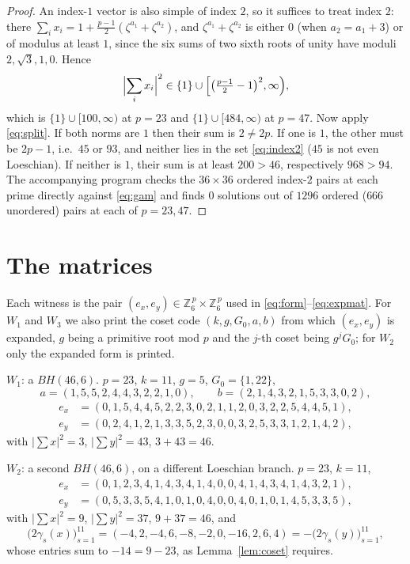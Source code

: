 \documentclass[11pt]{amsart}
\theoremstyle{remark}
\newcommand{\zzz}{\zeta}
\begin{document}
\begin{proof}
An index-$1$ vector is also simple of index $2$, so it suffices to treat
index $2$: there $\sum_ix_i=1+\tfrac{p-1}{2}(\zzz^{a_1}+\zzz^{a_2})$, and
$\zzz^{a_1}+\zzz^{a_2}$ is either $0$ (when $a_2=a_1+3$) or of modulus at
least $1$, since the six sums of two sixth roots of unity have moduli
$2,\sqrt3,1,0$. Hence
\begin{equation}\label{eq:index2}
 \Bigl|\sum_ix_i\Bigr|^{2}\in
 \{1\}\cup\Bigl[\bigl(\tfrac{p-1}{2}-1\bigr)^{2},\infty\Bigr),
\end{equation}
which is $\{1\}\cup[100,\infty)$ at $p=23$ and $\{1\}\cup[484,\infty)$ at
$p=47$.
Now apply \eqref{eq:split}. If both norms are $1$ then their sum is $2\ne2p$.
If one is $1$, the other must be $2p-1$, i.e.\ $45$ or $93$, and neither lies
in the set \eqref{eq:index2} ($45$ is not even Loeschian). If neither is $1$,
their sum is at least $200>46$, respectively $968>94$. The accompanying
program checks the $36\times36$ ordered index-$2$
pairs at each prime directly against \eqref{eq:gam} and finds $0$ solutions
out of $1296$ ordered ($666$ unordered) pairs at each of $p=23,47$.
\end{proof}

\section{The matrices}\label{sec:witness}

Each witness is the pair $(e_x,e_y)\in\mathbb Z_6^{\,p}\times\mathbb Z_6^{\,p}$
used in \eqref{eq:form}--\eqref{eq:expmat}. For $W_1$ and $W_3$ we also print
the coset code $(k,g,G_0,a,b)$ from which $(e_x,e_y)$ is expanded, $g$ being a
primitive root mod $p$ and the $j$-th coset being $g^{j}G_0$; for $W_2$ only
the expanded form is printed.

\medskip
\noindent$W_1$: a $BH(46,6)$. $p=23$, $k=11$, $g=5$, $G_0=\{1,22\}$,
\[
 a=(1,5,5,2,4,4,3,2,2,1,0),\qquad b=(2,1,4,3,2,1,5,3,3,0,2),
\]
\[
\begin{aligned}
 e_x&=(0,1,5,4,4,5,2,2,3,0,2,1,1,2,0,3,2,2,5,4,4,5,1),\\
 e_y&=(0,2,4,1,2,1,3,3,5,2,3,0,0,3,2,5,3,3,1,2,1,4,2),
\end{aligned}
\]
with $|\sum x|^{2}=3$, $|\sum y|^{2}=43$, $3+43=46$.

\medskip
\noindent$W_2$: a second $BH(46,6)$, on a different Loeschian branch.
$p=23$, $k=11$,
\[
\begin{aligned}
 e_x&=(0,1,2,3,4,1,4,3,4,1,4,0,0,4,1,4,3,4,1,4,3,2,1),\\
 e_y&=(0,5,3,3,5,4,1,0,1,0,4,0,0,4,0,1,0,1,4,5,3,3,5),
\end{aligned}
\]
with $|\sum x|^{2}=9$, $|\sum y|^{2}=37$, $9+37=46$, and
\[
 \bigl(2\gamma_s(x)\bigr)_{s=1}^{11}
 =(-4,2,-4,6,-8,-2,0,-16,2,6,4)
 =-\bigl(2\gamma_s(y)\bigr)_{s=1}^{11},
\]
whose entries sum to $-14=9-23$, as Lemma~\ref{lem:coset} requires.
\end{document}
